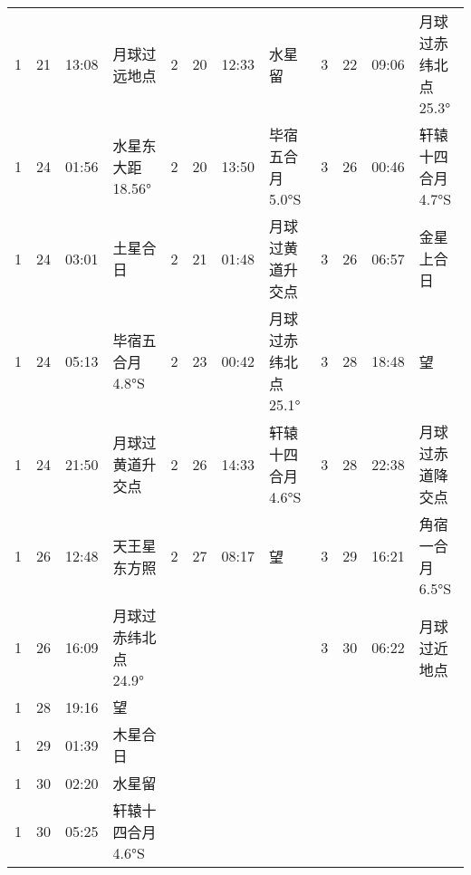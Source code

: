 \begin{tabular}{llll|llll|llll}
1 & 21 & 13:08 & 月球过远地点 & 2 & 20 & 12:33 & 水星留 & 3 & 22 & 09:06 & 月球过赤纬北点 25.3° \tabularnewline
1 & 24 & 01:56 & 水星东大距 18.56° & 2 & 20 & 13:50 & 毕宿五合月 5.0°S & 3 & 26 & 00:46 & 轩辕十四合月 4.7°S \tabularnewline
1 & 24 & 03:01 & 土星合日 & 2 & 21 & 01:48 & 月球过黄道升交点 & 3 & 26 & 06:57 & 金星上合日 \tabularnewline
1 & 24 & 05:13 & 毕宿五合月 4.8°S & 2 & 23 & 00:42 & 月球过赤纬北点 25.1° & 3 & 28 & 18:48 & 望 \tabularnewline
1 & 24 & 21:50 & 月球过黄道升交点 & 2 & 26 & 14:33 & 轩辕十四合月 4.6°S & 3 & 28 & 22:38 & 月球过赤道降交点 \tabularnewline
1 & 26 & 12:48 & 天王星东方照 & 2 & 27 & 08:17 & 望 & 3 & 29 & 16:21 & 角宿一合月 6.5°S \tabularnewline
1 & 26 & 16:09 & 月球过赤纬北点 24.9° &  &  &  &  & 3 & 30 & 06:22 & 月球过近地点 \tabularnewline
1 & 28 & 19:16 & 望 &  &  &  &  &  &  &  &  \tabularnewline
1 & 29 & 01:39 & 木星合日 &  &  &  &  &  &  &  &  \tabularnewline
1 & 30 & 02:20 & 水星留 &  &  &  &  &  &  &  &  \tabularnewline
1 & 30 & 05:25 & 轩辕十四合月 4.6°S &  &  &  &  &  &  &  &  \tabularnewline
\hline \end{tabular}


